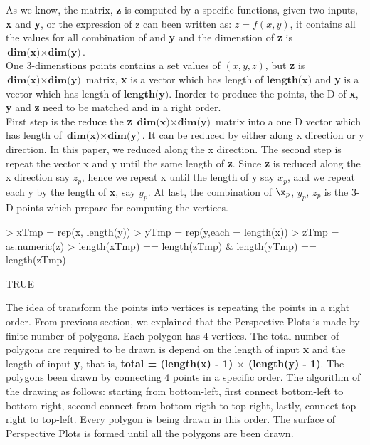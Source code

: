\documentclass[paper=a4, fontsize=11pt]{report}
\begin{document}
As we know, the matrix, \textbf{z} is computed by a specific functions, given two inputs, \textbf{x} and \textbf{y}, or the expression of z can been written as: $z = f(x,y)$, it contains all the values for all combination of  and \textbf{y} and the dimenstion of \textbf{z} is $ \textbf{dim(x)} \times \textbf{dim(y)}$.\\

One 3-dimenstions points contains a set values of $(x, y, z)$, but \textbf{z} is $\textbf{dim(x)} \times \textbf{dim(y)}$ matrix, \textbf{x} is a vector which has length of $\textbf{length(x)}$ and \textbf{y} is a vector which has length of $\textbf{length(y)}$. Inorder to produce the points, the D of \textbf{x}, \textbf{y} and \textbf{z} need to be matched and in a right order.\\

First step is the reduce the \textbf{z} $\textbf{dim(x)} \times \textbf{dim(y)}$ matrix into a one D vector which has length of $\textbf{dim(x)} \times \textbf{dim(y)}$. It can be reduced by either along x direction or y direction. In this paper, we reduced along the x direction. The second step is repeat the vector x and y until the same length of \textbf{z}. Since \textbf{z} is reduced along the x direction say $z_p$, hence we repeat x until the length of y say $x_p$, and we repeat each y by the length of \textbf{x}, say $y_p$. At last, the combination of $\x_p$, $y_p$, $z_p$ is the 3-D points which prepare for computing the vertices. \\
\begin{Schunk}
\begin{Sinput}
> xTmp = rep(x, length(y))
> yTmp = rep(y,each = length(x))
> zTmp = as.numeric(z)
> length(xTmp) == length(zTmp) & length(yTmp) == length(zTmp)
\end{Sinput}
\begin{Soutput}
[1] TRUE
\end{Soutput}
\end{Schunk}

The idea of transform the points into vertices is repeating the points in a right order. From previous section, we explained that the Perspective Plots is made by finite number of polygons. Each polygon has 4 vertices. The total number of polygons are required to be drawn is depend on the length of input \textbf{x} and the length of input \textbf{y}, that is, \textbf{total = (length(x) - 1) $\times$ (length(y) - 1)}. The polygons been drawn by connecting 4 points in a specific order. The algorithm of the drawing as follows: starting from bottom-left, first connect bottom-left to bottom-right, second connect from bottom-rigth to top-right, lastly, connect top-right to top-left. Every polygon is being drawn in this order. The surface of Perspective Plots is formed until all the polygons are been drawn. \\
\end{document}
